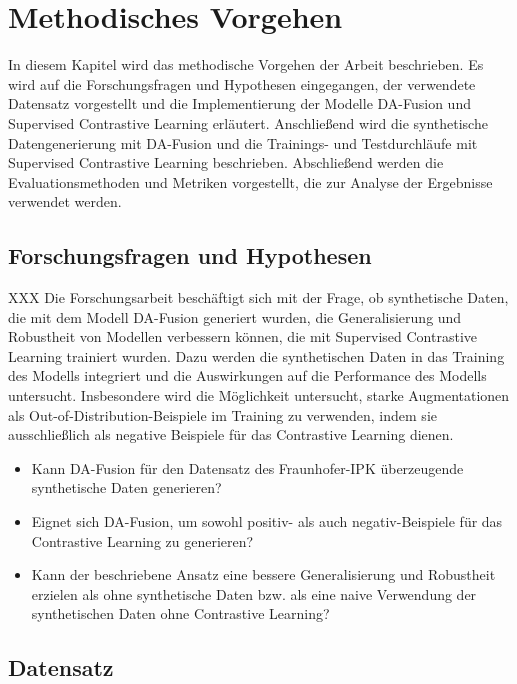 \chapter{Methodisches Vorgehen}

In diesem Kapitel wird das methodische Vorgehen der Arbeit beschrieben. Es wird auf die Forschungsfragen und Hypothesen eingegangen, der verwendete Datensatz vorgestellt und die Implementierung der Modelle DA-Fusion und Supervised Contrastive Learning erläutert. Anschließend wird die synthetische Datengenerierung mit DA-Fusion und die Trainings- und Testdurchläufe mit Supervised Contrastive Learning beschrieben. Abschließend werden die Evaluationsmethoden und Metriken vorgestellt, die zur Analyse der Ergebnisse verwendet werden.

\section{Forschungsfragen und Hypothesen}

XXX Die Forschungsarbeit beschäftigt sich mit der Frage, ob synthetische Daten, die mit dem Modell DA-Fusion generiert wurden, die Generalisierung und Robustheit von Modellen verbessern können, die mit Supervised Contrastive Learning trainiert wurden. Dazu werden die synthetischen Daten in das Training des Modells integriert und die Auswirkungen auf die Performance des Modells untersucht. Insbesondere wird die Möglichkeit untersucht, starke Augmentationen als Out-of-Distribution-Beispiele im Training zu verwenden, indem sie ausschließlich als negative Beispiele für das Contrastive Learning dienen.

\begin{itemize}[]
	\item Kann DA-Fusion für den Datensatz des Fraunhofer-IPK überzeugende synthetische Daten generieren?
	\item Eignet sich DA-Fusion, um sowohl positiv- als auch negativ-Beispiele für das Contrastive Learning zu generieren?
	\item Kann der beschriebene Ansatz eine bessere Generalisierung und Robustheit erzielen als ohne synthetische Daten bzw. als eine naive Verwendung der synthetischen Daten ohne Contrastive Learning?
\end{itemize}

\section{Datensatz}

